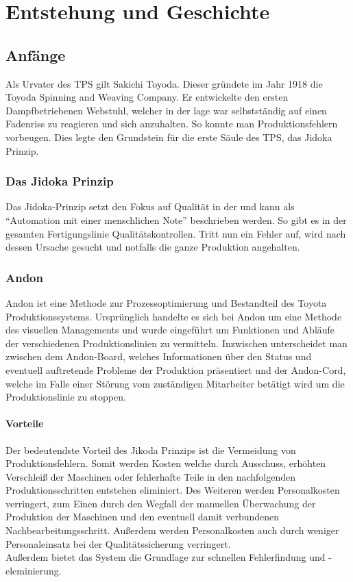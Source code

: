 \documentclass[00_ToyotaProduktionssystem.tex]{subfiles}
\begin{document}
\chapter{Entstehung und Geschichte}
\label{chap:ENTSTEHUNG}
\section{Anfänge}
Als Urvater des TPS gilt Sakichi Toyoda. Dieser gründete im Jahr 1918 die Toyoda Spinning and Weaving Company. Er entwickelte den ersten Dampfbetriebenen Webstuhl, welcher in der lage war selbstständig auf einen Fadenriss zu reagieren und sich anzuhalten. So konnte man Produktionsfehlern vorbeugen. Dies legte den Grundstein für die erste Säule des TPS, das Jidoka Prinzip.
\subsection{Das Jidoka Prinzip}
Das Jidoka-Prinzip setzt den Fokus auf Qualität in der  und kann als “Automation mit einer menschlichen Note” beschrieben werden. So gibt es in der gesamten Fertigungslinie Qualitätskontrollen. Tritt nun ein Fehler auf, wird nach dessen Ursache gesucht und notfalls die ganze Produktion angehalten.
\subsection{Andon}
Andon ist eine Methode zur Prozessoptimierung und Bestandteil des Toyota Produktionssystems. Ursprünglich handelte es sich bei Andon um eine Methode des visuellen Managements und wurde eingeführt um Funktionen und Abläufe der verschiedenen Produktionslinien zu vermitteln. Inzwischen unterscheidet man zwischen dem Andon-Board, welches Informationen über den Status und eventuell auftretende Probleme der Produktion präsentiert und der Andon-Cord, welche im Falle einer Störung vom zuständigen Mitarbeiter betätigt wird um die Produktionslinie zu stoppen.
\subsubsection{Vorteile}
Der bedeutendste Vorteil des Jikoda Prinzips ist die Vermeidung von Produktionsfehlern. Somit werden Kosten   welche durch Ausschuss, erhöhten Verschleiß der Maschinen oder fehlerhafte Teile in den nachfolgenden Produktionsschritten entstehen eliminiert. Des Weiteren werden Personalkosten verringert, zum Einen durch den Wegfall der manuellen Überwachung der Produktion der Maschinen und den eventuell damit verbundenen Nachbearbeitungsschritt. Außerdem werden Personalkosten auch durch weniger Personaleinsatz bei der Qualitätssicherung verringert.\\
Außerdem bietet das System die Grundlage zur schnellen Fehlerfindung und -eleminierung.
\end{document}
